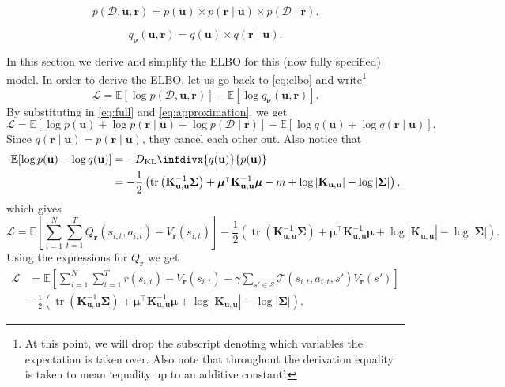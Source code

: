 \documentclass{article}
\theoremstyle{definition}
\theoremstyle{remark}
\DeclareMathOperator{\tr}{tr}
\newcommand{\pfull}{p(\mathcal{D}, \mathbf{u}, \mathbf{r})}
\newcommand{\approximation}{q_{\bm\nu}(\mathbf{u}, \mathbf{r})}
\newcommand{\Kuu}{\mathbf{K}_{\mathbf{u},\mathbf{u}}}
\newcommand{\V}{V_{\mathbf{r}}}
\newcommand{\DKL}{D_{\mathrm{KL}}\infdivx}
\begin{document}
\begin{equation} \label{eq:full}
  \pfull = p(\mathbf{u}) \times p(\mathbf{r} \mid \mathbf{u}) \times p(\mathcal{D} \mid \mathbf{r}).
\end{equation}

\begin{equation} \label{eq:approximation}
  \approximation = q(\mathbf{u}) \times q(\mathbf{r} \mid \mathbf{u}).
\end{equation}

In this section we derive and simplify the ELBO for this (now fully specified)
model. In order to derive the ELBO, let us go back to \eqref{eq:elbo} and
write\footnote{At this point, we will drop the subscript denoting which
  variables the expectation is taken over. Also note that throughout the
  derivation equality is taken to mean `equality up to an additive constant'.}
\[
  \mathcal{L} = \mathbb{E}[\log\pfull] - \mathbb{E}[\log\approximation].
\]
By substituting in \eqref{eq:full} and \eqref{eq:approximation}, we get
\[
  \mathcal{L} = \mathbb{E}[\log p(\mathbf{u}) + \log p(\mathbf{r} \mid
  \mathbf{u}) + \log p(\mathcal{D} \mid \mathbf{r})] - \mathbb{E}[\log
  q(\mathbf{u}) + \log q(\mathbf{r} \mid \mathbf{u})].
\]
Since $q(\mathbf{r} \mid \mathbf{u}) = p(\mathbf{r} \mid \mathbf{u})$, they
cancel each other out. Also notice that
\[
  \begin{split}
    \mathbb{E}[\log p(\mathbf{u}) - \log q(\mathbf{u})] &=
    -\DKL{q(\mathbf{u})}{p(\mathbf{u})} \\
    &= -\frac{1}{2} \left( \tr \left( \Kuu^{-1}\bm\Sigma \right) +
      \bm\mu^\intercal\Kuu^{-1}\bm\mu - m + \log |\Kuu| - \log |\bm\Sigma|
    \right),
  \end{split}
\] %
which gives
\[
  \mathcal{L} = \mathbb{E}\left[ \sum_{i=1}^N \sum_{t=1}^T
    Q_{\mathbf{r}}(s_{i,t}, a_{i,t}) - \V(s_{i,t}) \right] - \frac{1}{2} \left(
    \tr \left( \Kuu^{-1}\bm\Sigma \right) + \bm\mu^\intercal\Kuu^{-1}\bm\mu +
    \log |\Kuu| - \log |\bm\Sigma| \right).
\]
Using the expressions for $Q_{\mathbf{r}}$ we get
\[
  \begin{split}
  \mathcal{L} &= \mathbb{E}\left[\sum_{i=1}^N \sum_{t=1}^T r(s_{i,t}) -
    \V(s_{i,t}) + \gamma\sum_{s' \in \mathcal{S}} \mathcal{T}(s_{i,t}, a_{i,t},
    s')\V(s') \right] \\
  &- \frac{1}{2} \left(\tr \left( \Kuu^{-1}\bm\Sigma \right) +
    \bm\mu^\intercal\Kuu^{-1}\bm\mu + \log |\Kuu| - \log |\bm\Sigma| \right).
  \end{split}
\]
\end{document}
